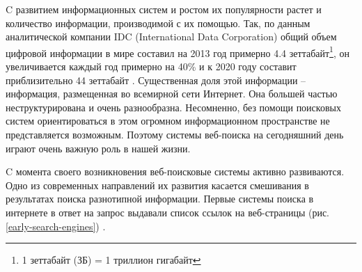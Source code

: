 \documentclass[12pt,a4paper]{report}
\newcommand\figref[1]{(рис. \ref{#1})}
\begin{document}
C развитием информационных систем и ростом их популярности растет и количество информации, производимой с их помощью. Так, по данным аналитической компании IDC (International Data Corporation) общий объем цифровой информации в мире составил на 2013 год примерно 4.4 зеттабайт\footnote{1 зеттабайт (ЗБ) = 1 триллион гигабайт}, он увеличивается каждый год примерно на 40\% и к 2020 году составит приблизительно 44 зеттабайт \cite{IDC-Analytics}. Существенная доля этой информации -- информация, размещенная во всемирной сети Интернет. Она большей частью неструктурирована и очень разнообразна. Несомненно, без помощи поисковых систем ориентироваться в этом огромном информационном пространстве не представляется возможным. Поэтому системы веб-поиска на сегодняшний день играют очень важную роль в нашей жизни.

C момента своего возникновения веб-поисковые системы активно развиваются. Одно из современных направлений их развития касается смешивания в результатах поиска разнотипной информации. Первые системы поиска в интернете в ответ на запрос выдавали список ссылок на веб-страницы \figref{early-search-engines} \cite{SearchHistory}.
\end{document}
